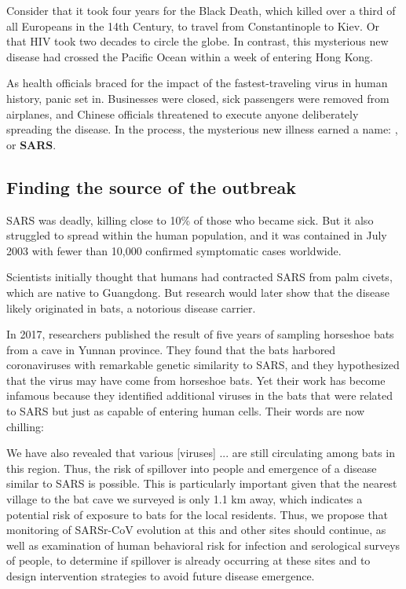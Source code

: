 Consider that it took four years for the Black Death, which killed over a third of all Europeans in the 14th Century, to travel from Constantinople to Kiev. Or that HIV took two decades to circle the globe. In contrast, this mysterious new disease had crossed the Pacific Ocean within a week of entering Hong Kong.

As health officials braced for the impact of the fastest-traveling virus in human history, panic set in. Businesses were closed, sick passengers were removed from airplanes, and Chinese officials threatened to execute anyone deliberately spreading the disease. In the process, the mysterious new illness earned a name: , or \textbf{SARS}.

\FloatBarrier
{}
\subsection{Finding the source of the outbreak}

SARS was deadly, killing close to 10\% of those who became sick. But it also struggled to spread within the human population, and it was contained in July 2003 with fewer than 10,000 confirmed symptomatic cases worldwide.

Scientists initially thought that humans had contracted SARS from palm civets, which are native to Guangdong. But research would later show that the disease likely originated in bats, a notorious disease carrier.

In 2017, researchers published the result of five years of sampling horseshoe bats from a cave in Yunnan province. They found that the bats harbored coronaviruses with remarkable genetic similarity to SARS, and they hypothesized that the virus may have come from horseshoe bats. Yet their work has become infamous because they identified additional viruses in the bats that were related to SARS but just as capable of entering human cells. Their words are now chilling:

\begin{displayquote}
	We have also revealed that various [viruses] ... are still circulating among bats in this region. Thus, the risk of spillover into people and emergence of a disease similar to SARS is possible. This is particularly important given that the nearest village to the bat cave we surveyed is only 1.1 km away, which indicates a potential risk of exposure to bats for the local residents. Thus, we propose that monitoring of SARSr-CoV evolution at this and other sites should continue, as well as examination of human behavioral risk for infection and serological surveys of people, to determine if spillover is already occurring at these sites and to design intervention strategies to avoid future disease emergence.
\end{displayquote}

